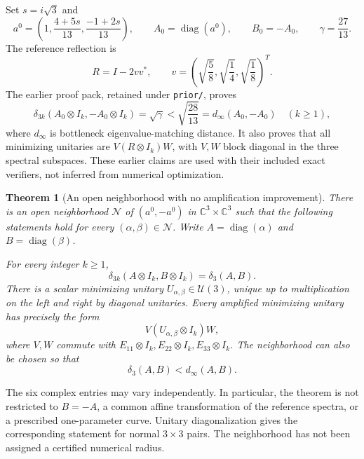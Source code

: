 \documentclass[11pt]{article}
\newtheorem{theorem}{Theorem}[section]
\theoremstyle{remark}\newtheorem{remark}[theorem]{Remark}
\newcommand{\C}{\mathbb C}
\newcommand{\U}{\mathcal U}
\newcommand{\diag}{\operatorname{diag}}
\begin{document}
Set $s=i\sqrt3$ and
\begin{equation}\label{eq:reference}
 a^0=\left(1,\frac{4+5s}{13},\frac{-1+2s}{13}\right),\qquad
 A_0=\diag(a^0),\qquad B_0=-A_0,\qquad \gamma=\frac{27}{13}.
\end{equation}
The reference reflection is
\begin{equation}\label{eq:R}
 R=I-2vv^*,\qquad
 v=\left(\sqrt{\frac58},\sqrt{\frac14},\sqrt{\frac18}\right)^T.
\end{equation}
The earlier proof pack, retained under \texttt{prior/}, proves
\begin{equation}\label{eq:old}
 \delta_{3k}(A_0\otimes I_k,-A_0\otimes I_k)=\sqrt{\gamma}
 <\sqrt{\frac{28}{13}}=d_\infty(A_0,-A_0)
 \quad(k\ge1),
\end{equation}
where $d_\infty$ is bottleneck eigenvalue-matching distance. It also proves that all minimizing unitaries are $V(R\otimes I_k)W$, with $V,W$ block diagonal in the three spectral subspaces. These earlier claims are used with their included exact verifiers, not inferred from numerical optimization.

\begin{theorem}[An open neighborhood with no amplification improvement]\label{thm:open}
There is an open neighborhood $\mathcal N$ of $(a^0,-a^0)$ in $\C^3\times\C^3$ such that the following statements hold for every $(\alpha,\beta)\in\mathcal N$. Write $A=\diag(\alpha)$ and $B=\diag(\beta)$.

For every integer $k\ge1$,
\begin{equation}\label{eq:local-invariance}
 \delta_{3k}(A\otimes I_k,B\otimes I_k)=\delta_3(A,B).
\end{equation}
There is a scalar minimizing unitary $U_{\alpha,\beta}\in\U(3)$, unique up to multiplication on the left and right by diagonal unitaries. Every amplified minimizing unitary has precisely the form
\begin{equation}\label{eq:local-rigidity}
 V(U_{\alpha,\beta}\otimes I_k)W,
\end{equation}
where $V,W$ commute with $E_{11}\otimes I_k,E_{22}\otimes I_k,E_{33}\otimes I_k$. The neighborhood can also be chosen so that
\[
 \delta_3(A,B)<d_\infty(A,B).
\]
\end{theorem}
The six complex entries may vary independently. In particular, the theorem is not restricted to $B=-A$, a common affine transformation of the reference spectra, or a prescribed one-parameter curve. Unitary diagonalization gives the corresponding statement for normal $3\times3$ pairs. The neighborhood has not been assigned a certified numerical radius.
\end{document}
